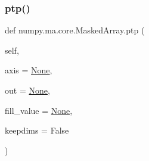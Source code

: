 \subsubsection{\texorpdfstring{ptp()}{ptp()}}
{\footnotesize\ttfamily def numpy.\+ma.\+core.\+Masked\+Array.\+ptp (\begin{DoxyParamCaption}\item[{}]{self,  }\item[{}]{axis = {\ttfamily \hyperlink{namespacenumpy_1_1ma_1_1core_a647ee1848dfa3692fe35a663a2aa40b3}{None}},  }\item[{}]{out = {\ttfamily \hyperlink{namespacenumpy_1_1ma_1_1core_a647ee1848dfa3692fe35a663a2aa40b3}{None}},  }\item[{}]{fill\+\_\+value = {\ttfamily \hyperlink{namespacenumpy_1_1ma_1_1core_a647ee1848dfa3692fe35a663a2aa40b3}{None}},  }\item[{}]{keepdims = {\ttfamily False} }\end{DoxyParamCaption})}

